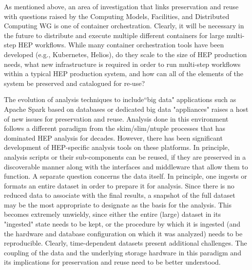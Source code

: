\documentclass[12pt,a4paper]{article}
\begin{document}
As mentioned above, an area of investigation that links preservation and reuse with questions raised by the Computing Models, Facilities, and Distributed Computing WG is one of container orchestration.  Clearly, it will be necessary in the future to distribute and execute multiple different containers for large multi-step HEP workflows.  While many container orchestration tools have been developed (e.g., Kubernetes, Helios), do they scale to the size of HEP production needs, what new infrastructure is required in order to run multi-step workflows within a typical HEP production system, and how can all of the elements of the system be preserved and catalogued for re-use?

The evolution of analysis techniques to include``big data" applications such as Apache Spark based on databases or dedicated big data "appliances" raises a host of new issues for preservation and reuse.  Analysis done in this environment follows a different paradigm from the skim/slim/ntuple processes that has dominated HEP analysis for decades.  However, there has been significant development of HEP-specific analysis tools on these platforms\cite{DIANA}.  In principle, analysis scripts or their sub-components can be reused, if they are preserved in a discoverable manner along with the interfaces and middleware that allow them to function. A separate question concerns the data itself.  In principle, one ingests or formats an entire dataset in order to prepare it for analysis.  Since there is no reduced data to associate with the final results, a snapshot of the full dataset may be the most appropriate to designate as the basis for the analysis.  This becomes extremely unwieldy, since either the entire (large) dataset in its "ingested" state needs to be kept, or the procedure by which it is ingested (and the hardware and database configuration on which it was analyzed) needs to be reproducible. Clearly, time-dependent datasets present additional challenges. The coupling of the data and the underlying storage hardware in this paradigm and its implications for preservation and reuse need to be better understood.
\end{document}
